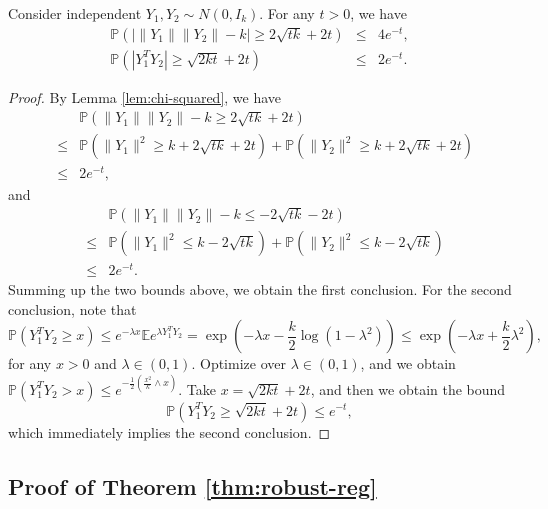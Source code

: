 \begin{lemma}\label{lem:inner-prod}
Consider independent $Y_1,Y_2\sim N(0,I_k)$. For any $t>0$, we have
\begin{eqnarray*}
\mathbb{P}\left(|\|Y_1\|\|Y_2\|-k|\geq 2\sqrt{tk}+2t\right) &\leq& 4e^{-t}, \\
\mathbb{P}\left(|Y_1^TY_2| \geq \sqrt{2kt}+2t\right) &\leq& 2e^{-t}.
\end{eqnarray*}
\end{lemma}
\begin{proof}
By Lemma \ref{lem:chi-squared}, we have
\begin{eqnarray*}
&& \mathbb{P}\left(\|Y_1\|\|Y_2\| -k \geq 2\sqrt{tk}+2t\right) \\
&\leq& \mathbb{P}\left(\|Y_1\|^2 \geq k +2\sqrt{tk}+2t\right) + \mathbb{P}\left(\|Y_2\|^2 \geq k +2\sqrt{tk}+2t\right) \\
&\leq& 2e^{-t},
\end{eqnarray*}
and
\begin{eqnarray*}
&& \mathbb{P}\left(\|Y_1\|\|Y_2\| -k \leq -2\sqrt{tk}-2t\right) \\
&\leq& \mathbb{P}\left(\|Y_1\|^2 \leq k -2\sqrt{tk}\right) + \mathbb{P}\left(\|Y_2\|^2 \leq k -2\sqrt{tk}\right) \\
&\leq& 2e^{-t}.
\end{eqnarray*}
Summing up the two bounds above, we obtain the first conclusion. For the second conclusion, note that
$$\mathbb{P}\left(Y_1^TY_2 \geq x\right)\leq e^{-\lambda x}\mathbb{E}e^{\lambda Y_1^TY_2}=\exp\left(-\lambda x-\frac{k}{2}\log(1-\lambda^2)\right)\leq \exp\left(-\lambda x+\frac{k}{2}\lambda^2\right),$$
for any $x>0$ and $\lambda\in (0,1)$. Optimize over $\lambda\in (0,1)$, and we obtain $\mathbb{P}\left(Y_1^TY_2>x\right)\leq e^{-\frac{1}{2}\left(\frac{x^2}{k}\wedge x\right)}$. Take $x=\sqrt{2kt}+2t$, and then we obtain the bound
$$\mathbb{P}\left(Y_1^TY_2 \geq \sqrt{2kt}+2t\right)\leq e^{-t},$$
which immediately implies the second conclusion.
\end{proof}



\subsection{Proof of Theorem \ref{thm:robust-reg}} \label{sec:pf-robust-reg}

